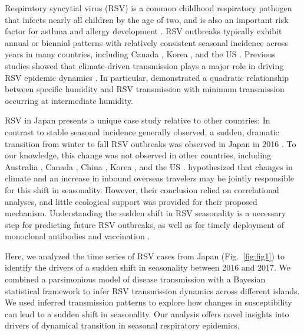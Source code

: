 \documentclass[12pt]{article}
\newcommand{\fref}[1]{Fig.~\ref{fig:#1}}
\begin{document}
Respiratory syncytial virus (RSV) is a common childhood respiratory pathogen that infects nearly all children by the age of two, and is also an important risk factor for asthma and allergy development \citep{sigurs1995asthma,sigurs2010asthma,edwards2012microbiology}.
RSV outbreaks typically exhibit annual or biennial patterns with relatively consistent seasonal incidence across years in many countries, including Canada \citep{paramo2023respiratory}, Korea \citep{kim2020investigation}, and the US \citep{pitzer2015environmental,baker2019epidemic}.
Previous studies showed that climate-driven transmission plays a major role in driving RSV epidemic dynamics \citep{pitzer2015environmental,baker2019epidemic}.
In particular, \cite{baker2019epidemic} demonstrated a quadratic relationship between specific humidity and RSV transmission with minimum transmission occurring at intermediate humidity.

RSV in Japan presents a unique case study relative to other countries: In contrast to stable seasonal incidence generally observed, a sudden, dramatic transition from winter to fall RSV outbreaks was observed in Japan in 2016 \citep{miyama2021seasonal,wagatsuma2021shifts}.
To our knowledge, this change was not observed in other countries, including Australia \citep{nazareno2022modelled}, Canada \citep{canada-report}, China \citep{luo2022comparison,li2023defining,li2024characterising}, Korea \citep{kim2023molecular}, and the US \citep{rose2018respiratory,hansen2022mortality}.
\cite{wagatsuma2021shifts} hypothesized that changes in climate and an increase in inbound overseas travelers may be jointly responsible for this shift in seasonality.
However, their conclusion relied on correlational analyses, and little ecological support was provided for their proposed mechanism.
Understanding the sudden shift in RSV seasonality is a necessary step for predicting future RSV outbreaks, as well as for timely deployment of monoclonal antibodies and vaccination \citep{mazur2023respiratory}.

Here, we analyzed the time series of RSV cases from Japan (\fref{fig1}) to identify the drivers of a sudden shift in seasonality between 2016 and 2017. 
We combined a parsimonious model of disease transmission with a Bayesian statistical framework to infer RSV transmission dynamics across different islands.
We used inferred transmission patterns to explore how changes in susceptibility can lead to a sudden shift in seasonality.
Our analysis offers novel insights into drivers of dynamical transition in seasonal respiratory epidemics.
\end{document}
